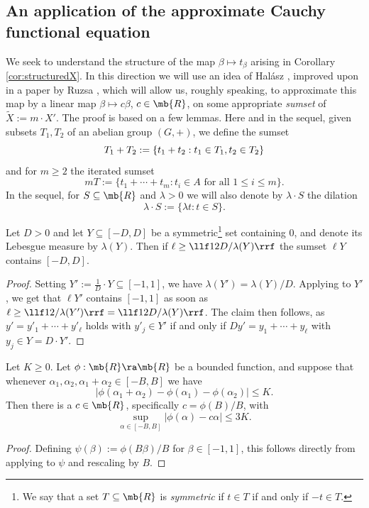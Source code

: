 \subsection{An application of the approximate Cauchy functional equation} \label{sec:CauchyFE}
We seek to understand the structure of the map $\beta \mapsto t_{\beta}$ arising in Corollary \ref{cor:structuredX}. In this direction we will use an idea of Hal\'{a}sz \cite{Hal}, improved upon in a paper by Ruzsa \cite{Hal}, which will allow us, roughly speaking, to approximate this map by a linear map $\beta \mapsto c\beta$, $c \in \mb{R}$, on some appropriate \emph{sumset} of $\tilde{X} := m \cdot X'$. 
%
The proof is based on a few lemmas. Here and in the sequel, given subsets $T_1,T_2$ of an abelian group $(G,+)$, we define the sumset
$$
T_1+T_2 := \{t_1+t_2 : t_1 \in T_1, t_2 \in T_2\} \\
$$ and for $m \geq 2$ the iterated sumset
$$
mT := \{t_1 + \cdots + t_m : t_i \in A  \text{ for all } 1 \leq i \leq m\}.
$$
In the sequel, for $S \subseteq \mb{R}$ and $\lambda > 0$ we will also denote by $\lambda \cdot S$ the dilation
$$
\lambda \cdot S := \{\lambda t : t \in S\}.
$$
%
%
%
%
%
%
\begin{lem}\label{lem:dilateRuzsa}
Let $D > 0$ and let $Y \subseteq [-D,D]$ be a symmetric\footnote{We say that a set $T \subseteq \mb{R}$ is \emph{symmetric} if $t \in T$ if and only if $-t \in T$.}  set containing 0, and denote its Lebesgue measure by $\lambda(Y)$. Then if $\ell \geq \llf 12D/\lambda(Y)\rrf$ the sumset $\ell Y$ contains $[-D,D]$. 
\end{lem}
\begin{proof} 
Setting $Y' := \tfrac{1}{D}\cdot Y \subseteq [-1,1]$, we have $\lambda(Y') = \lambda(Y)/D$. Applying \cite[Lemma (5.3)]{Ruz} to $Y'$, we get that $\ell Y'$ contains $[-1,1]$ as soon as $\ell \geq \llf 12/\lambda(Y') \rrf = \llf 12 D/\lambda(Y)\rrf$. The claim then follows, as $y' = y'_1 + \cdots + y'_\ell$ holds with $y'_j \in Y'$ if and only if $Dy' = y_1 + \cdots + y_\ell$ with $y_j \in Y = D \cdot Y'$. 
\end{proof}
\begin{lem}\label{lem:CauchyRuz}
Let $K \geq 0$. Let $\phi: \mb{R} \ra \mb{R}$ be a bounded function, and suppose that whenever $\alpha_1,\alpha_2,\alpha_1+\alpha_2 \in [-B,B]$ we have
$$
|\phi(\alpha_1+\alpha_2) - \phi(\alpha_1) - \phi(\alpha_2)| \leq K.
$$
Then there is a $c \in \mb{R}$, specifically $c = \phi(B)/B$, with
$$
\sup_{\alpha \in [-B,B]} |\phi(\alpha)-c\alpha| \leq 3K.
$$
\end{lem}
\begin{proof} 
Defining $\psi(\beta) := \phi(B\beta)/B$ for $\beta \in [-1,1]$, this follows directly from applying \cite[Lem. 5.11]{Ruz} to $\psi$ and rescaling by $B$. %
\end{proof}

